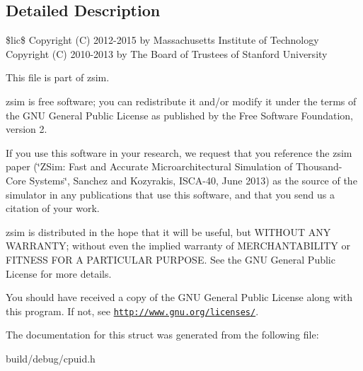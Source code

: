 \subsection{Detailed Description}
\$lic\$ Copyright (C) 2012-\/2015 by Massachusetts Institute of Technology Copyright (C) 2010-\/2013 by The Board of Trustees of Stanford University

This file is part of zsim.

zsim is free software; you can redistribute it and/or modify it under the terms of the G\-N\-U General Public License as published by the Free Software Foundation, version 2.

If you use this software in your research, we request that you reference the zsim paper (\char`\"{}\-Z\-Sim\-: Fast and Accurate Microarchitectural Simulation of
\-Thousand-\/\-Core Systems\char`\"{}, Sanchez and Kozyrakis, I\-S\-C\-A-\/40, June 2013) as the source of the simulator in any publications that use this software, and that you send us a citation of your work.

zsim is distributed in the hope that it will be useful, but W\-I\-T\-H\-O\-U\-T A\-N\-Y W\-A\-R\-R\-A\-N\-T\-Y; without even the implied warranty of M\-E\-R\-C\-H\-A\-N\-T\-A\-B\-I\-L\-I\-T\-Y or F\-I\-T\-N\-E\-S\-S F\-O\-R A P\-A\-R\-T\-I\-C\-U\-L\-A\-R P\-U\-R\-P\-O\-S\-E. See the G\-N\-U General Public License for more details.

You should have received a copy of the G\-N\-U General Public License along with this program. If not, see \href{http://www.gnu.org/licenses/}{\tt http\-://www.\-gnu.\-org/licenses/}. 

The documentation for this struct was generated from the following file\-:\begin{DoxyCompactItemize}
\item 
build/debug/cpuid.\-h\end{DoxyCompactItemize}
